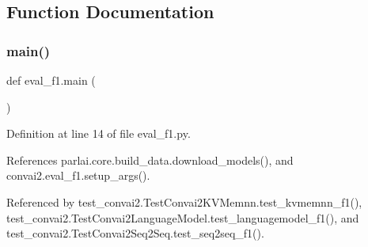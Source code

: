 \subsection{Function Documentation}
\mbox{\label{namespaceeval__f1_a4e679ae3282c9831e50ff8ed0a325a0e}} 
\subsubsection{\texorpdfstring{main()}{main()}}
{\footnotesize\ttfamily def eval\+\_\+f1.\+main (\begin{DoxyParamCaption}{ }\end{DoxyParamCaption})}



Definition at line 14 of file eval\+\_\+f1.\+py.



References parlai.\+core.\+build\+\_\+data.\+download\+\_\+models(), and convai2.\+eval\+\_\+f1.\+setup\+\_\+args().



Referenced by test\+\_\+convai2.\+Test\+Convai2\+K\+V\+Memnn.\+test\+\_\+kvmemnn\+\_\+f1(), test\+\_\+convai2.\+Test\+Convai2\+Language\+Model.\+test\+\_\+languagemodel\+\_\+f1(), and test\+\_\+convai2.\+Test\+Convai2\+Seq2\+Seq.\+test\+\_\+seq2seq\+\_\+f1().

